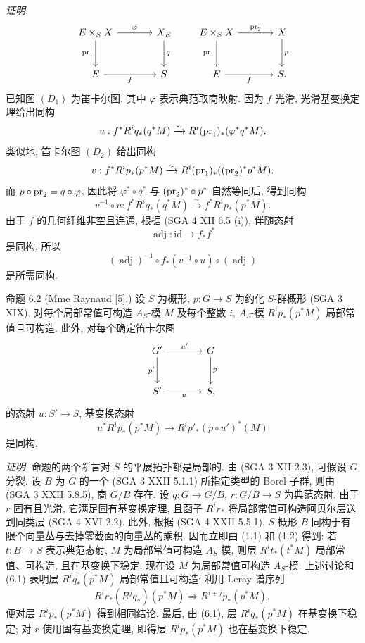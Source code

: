 \emph{证明.}
\[
\begin{tikzcd}[column sep=large,row sep=large]
E\times_S X \arrow[r,"\varphi"] \arrow[d,"\pr_1"'] & X_E \arrow[d,"q"]\\
E \arrow[r,"f"'] & S
\end{tikzcd}
\qquad
\begin{tikzcd}[column sep=large,row sep=large]
E\times_S X \arrow[r,"\pr_2"] \arrow[d,"\pr_1"'] & X \arrow[d,"p"]\\
E \arrow[r,"f"'] & S .
\end{tikzcd}
\]
已知图 $(D_1)$ 为笛卡尔图, 其中 $\varphi$ 表示典范取商映射. 因为 $f$ 光滑, 光滑基变换定理给出同构
\[
u:f^*R^iq_*(q^*M)\xrightarrow{\sim}R^i(\operatorname{pr}_1)_*(\varphi^*q^*M).
\]
类似地, 笛卡尔图 $(D_2)$ 给出同构
\[
v:f^*R^ip_*(p^*M)\xrightarrow{\sim}R^i(\operatorname{pr}_1)_*((\operatorname{pr}_2)^*p^*M).
\]
而 $p\circ\operatorname{pr}_2=q\circ\varphi$, 因此将 $\varphi^*\circ q^*$ 与 $(\operatorname{pr}_2)^*\circ p^*$ 自然等同后, 得到同构
\[
v^{-1}\circ u:f^*R^iq_*(q^*M)\xrightarrow{\sim} f^*R^ip_*(p^*M).
\]
由于 $f$ 的几何纤维非空且连通, 根据 (SGA 4 XII 6.5 (i)), 伴随态射
\[
\operatorname{adj}:\mathrm{id}\to f_*f^*
\]
是同构, 所以
\[
(\operatorname{adj})^{-1}\circ f_*(v^{-1}\circ u)\circ(\operatorname{adj})
\]
是所需同构.

\begin{statement}{命题 6.2}
(Mme Raynaud [5].) 设 $S$ 为概形, $p:G\to S$ 为约化 $S$-群概形 (SGA 3 XIX). 对每个局部常值可构造 $A_S$-模 $M$ 及每个整数 $i$, $A_S$-模 $R^ip_*(p^*M)$ 局部常值且可构造. 此外, 对每个确定笛卡尔图
\[
\begin{tikzcd}[column sep=large,row sep=large]
G' \arrow[r,"u'"] \arrow[d,"p'"'] & G \arrow[d,"p"]\\
S' \arrow[r,"u"'] & S,
\end{tikzcd}
\]
的态射 $u:S'\to S$, 基变换态射
\[
u^*R^ip_*(p^*M)\to R^ip'_*(p\circ u')^*(M)
\]
是同构.
\end{statement}

\emph{证明.} 命题的两个断言对 $S$ 的平展拓扑都是局部的. 由 (SGA 3 XII 2.3), 可假设 $G$ 分裂. 设 $B$ 为 $G$ 的一个 (SGA 3 XXII 5.1.1) 所指定类型的 Borel 子群, 则由 (SGA 3 XXII 5.8.5), 商 $G/B$ 存在. 设 $q:G\to G/B$, $r:G/B\to S$ 为典范态射. 由于 $r$ 固有且光滑, 它满足固有基变换定理, 且函子 $R^ir_*$ 将局部常值可构造阿贝尔层送到同类层 (SGA 4 XVI 2.2). 此外, 根据 (SGA 4 XXII 5.5.1), $S$-概形 $B$ 同构于有限个向量丛与去掉零截面的向量丛的乘积. 因而立即由 (1.1) 和 (1.2) 得到: 若 $t:B\to S$ 表示典范态射, $M$ 为局部常值可构造 $A_S$-模, 则层 $R^it_*(t^*M)$ 局部常值、可构造, 且在基变换下稳定. 现在设 $M$ 为局部常值可构造 $A_S$-模. 上述讨论和 (6.1) 表明层 $R^iq_*(p^*M)$ 局部常值且可构造; 利用 Leray 谱序列
\[
R^ir_*(R^jq_*)(p^*M)\Rightarrow R^{i+j}p_*(p^*M),
\]
便对层 $R^ip_*(p^*M)$ 得到相同结论. 最后, 由 (6.1), 层 $R^iq_*(p^*M)$ 在基变换下稳定; 对 $r$ 使用固有基变换定理, 即得层 $R^ip_*(p^*M)$ 也在基变换下稳定.

